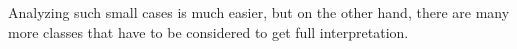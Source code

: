 \documentclass[final]{article}
\theoremstyle{definition}
\theoremstyle{remark}
\newcommand{\includeinlinescaledsvg}[3]{\begin{minipage}{#1\textwidth}\begin{center}\end{center}\end{minipage}}
\begin{document}
\begin{longtable}{| c | c |}

\end{longtable}

Analyzing such small cases is much easier, but on the other hand, there are many more classes that have to be considered to get full interpretation.
\end{document}
